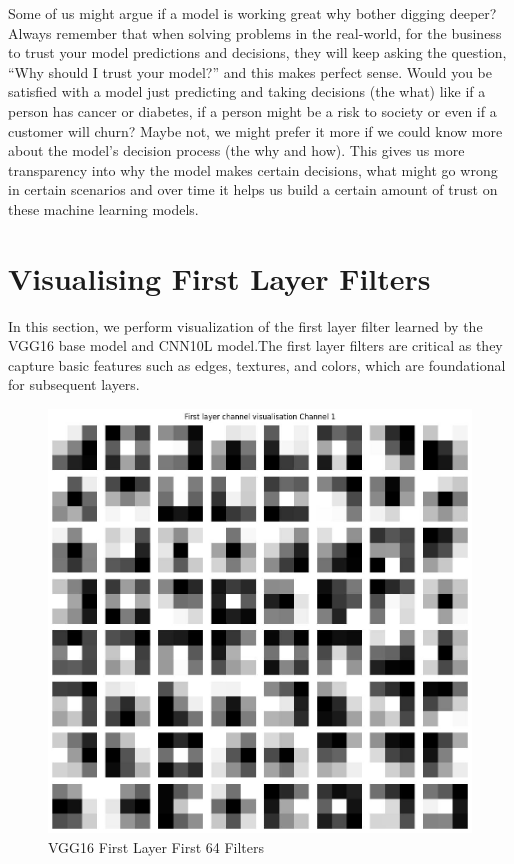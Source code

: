     Some of us might argue if a model is working great why bother digging deeper? Always remember that when solving problems in the real-world, for the business to trust your model predictions and decisions, they will keep asking the question, “Why should I trust your model?” and this makes perfect sense. Would you be satisfied with a model just predicting and taking decisions (the what) like if a person has cancer or diabetes, if a person might be a risk to society or even if a customer will churn? Maybe not, we might prefer it more if we could know more about the model’s decision process (the why and how). This gives us more transparency into why the model makes certain decisions, what might go wrong in certain scenarios and over time it helps us build a certain amount of trust on these machine learning models.\cite{WEBSITE:model-interpretation-medium}\par\vspace{1em}


\section{Visualising First Layer Filters}

In this section, we perform visualization of the first layer filter learned by the VGG16 base model and CNN10L model.The first layer filters are critical as they capture basic features such as edges, textures, and colors, which are foundational for subsequent layers.\par\vspace{1em}

\begin{figure}
    \centering
    \includegraphics[width=1\linewidth]{graphics//chapter7/vgg16 first filter.png}
    \caption{VGG16 First Layer First 64 Filters}
    \label{fig:vgg-filter}
\end{figure}

